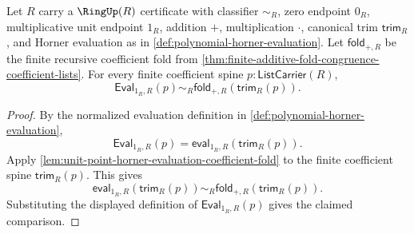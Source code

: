 \begin{theorem}
\label{thm:polynomial-evaluation-at-unit-coefficient-fold}
Let $R$ carry a $\RingUp(R)$ certificate with classifier $\sim_R$, zero endpoint $0_R$, multiplicative unit endpoint $1_R$, addition $+$, multiplication $\cdot$, canonical trim $\mathsf{trim}_R$, and Horner evaluation as in \autoref{def:polynomial-horner-evaluation}. Let $\mathsf{fold}_{+,R}$ be the finite recursive coefficient fold from \autoref{thm:finite-additive-fold-congruence-coefficient-lists}. For every finite coefficient spine $p:\mathsf{ListCarrier}(R)$,
$$
\mathsf{Eval}_{1_R,R}(p)\sim_R\mathsf{fold}_{+,R}(\mathsf{trim}_R(p)).
$$
\end{theorem}
\begin{proof}
By the normalized evaluation definition in \autoref{def:polynomial-horner-evaluation},
$$
\mathsf{Eval}_{1_R,R}(p)=\mathsf{eval}_{1_R,R}(\mathsf{trim}_R(p)).
$$
Apply \autoref{lem:unit-point-horner-evaluation-coefficient-fold} to the finite coefficient spine $\mathsf{trim}_R(p)$. This gives
$$
\mathsf{eval}_{1_R,R}(\mathsf{trim}_R(p))\sim_R\mathsf{fold}_{+,R}(\mathsf{trim}_R(p)).
$$
Substituting the displayed definition of $\mathsf{Eval}_{1_R,R}(p)$ gives the claimed comparison.
\end{proof}
